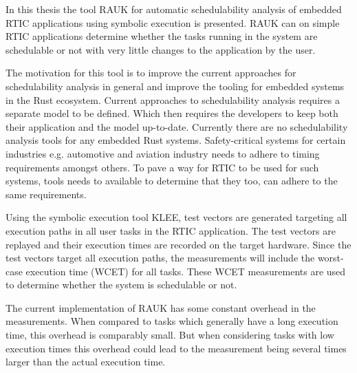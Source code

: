 In this thesis the tool RAUK for automatic schedulability analysis of embedded
RTIC applications using symbolic execution is presented. RAUK can on simple
RTIC applications determine whether the tasks running in the system are
schedulable or not with very little changes to the application by the user.

The motivation for this tool is to improve the current approaches for
schedulability analysis in general and improve the tooling for embedded
systems in the Rust ecosystem. Current approaches to schedulability
analysis requires a separate model to be defined. Which then requires
the developers to keep both their application and the model up-to-date.
Currently there are no schedulability analysis tools for any embedded Rust
systems. Safety-critical systems for certain industries e.g. automotive and
aviation industry needs to adhere to timing requirements amongst others. To
pave a way for RTIC to be used for such systems, tools needs to available to
determine that they too, can adhere to the same requirements.

Using the symbolic execution tool KLEE, test vectors are generated targeting
all execution paths in all user tasks in the RTIC application. The test vectors
are replayed and their execution times are recorded on the target hardware.
Since the test vectors target all execution paths, the measurements will
include the worst-case execution time (WCET) for all tasks. These WCET
measurements are used to determine whether the system is schedulable or not.

The current implementation of RAUK has some constant overhead in the
measurements. When compared to tasks which generally have a long execution
time, this overhead is comparably small. But when considering tasks
with low execution times this overhead could lead to the measurement
being several times larger than the actual execution time.
